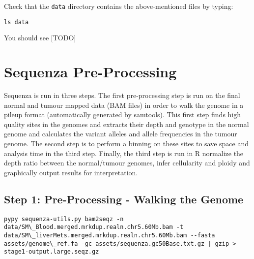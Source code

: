 \begin{steps}
Check that the \texttt{data} directory contains the above-mentioned files by typing:
\begin{lstlisting}
ls data
\end{lstlisting}
\end{steps}

You should see [TODO]



\section{Sequenza Pre-Processing}

Sequenza is run in three steps. The first pre-processing step is run on the final normal and tumour mapped data (BAM files) in order to walk the genome in a pileup format (automatically generated by samtools). This first step finds high quality sites in the genomes and extracts their depth and genotype in the normal genome and calculates the variant alleles and allele frequencies in the tumour genome. The second step is to perform a binning on these sites to save space and analysis time in the third step. Finally, the third step is run in R normalize the depth ratio between the normal/tumour genomes, infer cellularity and ploidy and graphically output results for interpretation.


\subsection{Step 1: Pre-Processing - Walking the Genome}

\begin{steps}
\begin{lstlisting}
pypy sequenza-utils.py bam2seqz -n data/SM\_Blood.merged.mrkdup.realn.chr5.60Mb.bam -t data/SM\_liverMets.merged.mrkdup.realn.chr5.60Mb.bam --fasta assets/genome\_ref.fa -gc assets/sequenza.gc50Base.txt.gz | gzip > stage1-output.large.seqz.gz
\end{lstlisting}
\end{steps}

